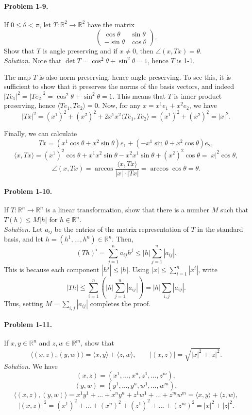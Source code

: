 \documentclass[11pt]{report}
\newcommand{\R}{\mathbb{R}}
\newcommand{\ip}[2]{\langle #1, #2 \rangle}
\newcommand{\problem}[1]{\paragraph{Problem #1.}}
\newcommand{\solution}{\noindent\textit{Solution.} }
\begin{document}
    \problem{1-9} If $0 \leq \theta < \pi$, let $T\colon \R^2 \to \R^2$ have the
    matrix \[
        \begin{pmatrix}
            \cos\theta & \sin\theta \\ -\sin\theta & \cos\theta
        \end{pmatrix}.
    \] Show that $T$ is angle preserving and if $x \neq 0$, then $\angle(x, Tx) =
    \theta$. \\

    \solution Note that $\det{T} = \cos^2\theta + \sin^2\theta = 1$, hence $T$ is
    1-1.

    The map $T$ is also norm preserving, hence angle preserving. To see this, it is
    sufficient to show that it preserves the norms of the basis vectors, and indeed
    $|Te_1|^2 = |Te_2|^2 = \cos^2\theta + \sin^2\theta = 1$. This means that $T$ is
    inner product preserving, hence $\ip{Te_1}{Te_2} = 0$. Now, for any $x = x^1e_1 +
    x^2e_2$, we have \[
        |Tx|^2 = (x^1)^2 + (x^2)^2 + 2x^1x^2\ip{Te_1}{Te_2} = (x^1)^2 + (x^2)^2 =
        |x|^2.
    \] 

    Finally, we can calculate \[
        Tx = (x^1\cos\theta + x^2\sin\theta)e_1 + (-x^1\sin\theta + x^2\cos\theta)e_2,
    \] \[
        \ip{x}{Tx} = (x^1)^2\cos\theta + x^1x^2\sin\theta - x^2x^1\sin\theta +
        (x^2)^2\cos\theta = |x|^2\cos\theta,
    \] \[
        \angle(x, Tx) = \arccos\frac{\ip{x}{Tx}}{|x|\cdot |Tx|} = \arccos\cos\theta =
        \theta.
    \] 


    \problem{1-10} If $T\colon \R^n \to \R^n$ is a linear transformation, show that
    there is a number $M$ such that $T(h) \leq M|h|$ for $h \in \R^n$. \\

    \solution Let $a_{ij}$ be the entries of the matrix representation of $T$ in the
    standard basis, and let $h = (h^1, \dots, h^n) \in \R^n$. Then, \[
        (Th)^i = \sum_{j = 1}^n a_{ij}h^j \leq |h|\sum_{j = 1}^n |a_{ij}|.
    \] This is because each component $|h^j| \leq |h|$. Using $|x| \leq \sum_{i =
    1}^n |x^i|$, write \[
        |Th| \leq \sum_{i = 1}^n \left(|h|\sum_{j = 1}^n |a_{ij}|\right) = |h|
        \sum_{i, j} |a_{ij}|.
    \] Thus, setting $M = \sum_{i, j} |a_{ij}|$ completes the proof.


    \problem{1-11} If $x, y \in \R^n$ and $z, w\in \R^m$, show that \[
        \ip{(x, z)}{(y, w)} = \ip{x}{y} + \ip{z}{w}, \qquad |(x, z)| = \sqrt{|x|^2 +
        |z|^2}.
    \] 
    \solution We have \[
        (x, z) = (x^1, \dots, x^n, z^1, \dots, z^m),
    \] \[
        (y, w) = (y^1, \dots, y^n, w^1, \dots, w^m),
    \] \[
        \ip{(x, z)}{(y, w)} = x^1y^1 + \dots + x^ny^n + z^1w^1 + \dots + z^mw^m =
        \ip{x}{y} + \ip{z}{w},
    \] \[
        |(x, z)|^2 = (x^1)^2 + \dots + (x^n)^2 + (z^1)^2 + \dots + (z^m)^2 = |x|^2 +
        |z|^2.
    \] 
\end{document}

